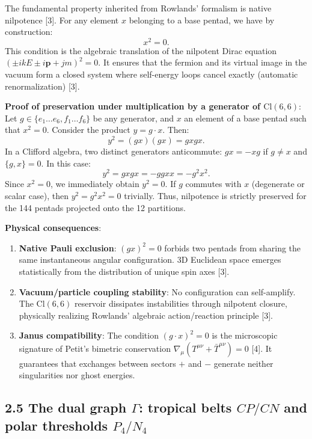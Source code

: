 \documentclass[11pt]{article}
\providecommand{\tightlist}{\setlength{\itemsep}{2pt}\setlength{\parskip}{6pt}}
\providecommand{\tightlist}{%
  \setlength{\itemsep}{2pt}\setlength{\parskip}{6pt}
}
\begin{document}
The fundamental property inherited from Rowlands' formalism is native
nilpotence {[}3{]}. For any element \(x\) belonging to a base pentad, we
have by construction: \[
x^2 = 0.
\] This condition is the algebraic translation of the nilpotent Dirac
equation \((\pm ikE \pm i\mathbf{p} + jm)^2 = 0\). It ensures that the
fermion and its virtual image in the vacuum form a closed system where
self-energy loops cancel exactly (automatic renormalization) {[}3{]}.

\textbf{Proof of preservation under multiplication by a generator of
\(\text{Cl}(6,6)\)}: Let \(g \in \{e_1\dots e_6, f_1\dots f_6\}\) be any
generator, and \(x\) an element of a base pentad such that \(x^2=0\).
Consider the product \(y = g \cdot x\). Then: \[
y^2 = (g x)(g x) = g x g x.
\] In a Clifford algebra, two distinct generators anticommute:
\(g x = -x g\) if \(g \neq x\) and \(\{g,x\}=0\). In this case: \[
y^2 = g x g x = -g g x x = -g^2 x^2.
\] Since \(x^2 = 0\), we immediately obtain \(y^2 = 0\). If \(g\)
commutes with \(x\) (degenerate or scalar case), then
\(y^2 = g^2 x^2 = 0\) trivially. Thus, nilpotence is strictly preserved
for the 144 pentads projected onto the 12 partitions.

\textbf{Physical consequences}:

\begin{enumerate}
\def\labelenumi{\arabic{enumi}.}
\tightlist
\item
  \textbf{Native Pauli exclusion}: \((g x)^2 = 0\) forbids two pentads
  from sharing the same instantaneous angular configuration. 3D
  Euclidean space emerges statistically from the distribution of unique
  spin axes {[}3{]}.
\item
  \textbf{Vacuum/particle coupling stability}: No configuration can
  self-amplify. The \(\text{Cl}(6,6)\) reservoir dissipates
  instabilities through nilpotent closure, physically realizing
  Rowlands' algebraic action/reaction principle {[}3{]}.
\item
  \textbf{Janus compatibility}: The condition \((g\cdot x)^2=0\) is the
  microscopic signature of Petit's bimetric conservation
  \(\nabla_\mu(T^{\mu\nu}+\bar{T}^{\mu\nu})=0\) {[}4{]}. It guarantees
  that exchanges between sectors \(+\) and \(-\) generate neither
  singularities nor ghost energies.
\end{enumerate}

\hypertarget{the-dual-graph-gamma-tropical-belts-cpcn-and-polar-thresholds-p_4n_4}{%
\subsection{\texorpdfstring{2.5 The dual graph \(\Gamma\): tropical
belts \(CP/CN\) and polar thresholds
\(P_4/N_4\)}{2.5 The dual graph \textbackslash Gamma: tropical belts CP/CN and polar thresholds P\_4/N\_4}}\label{the-dual-graph-gamma-tropical-belts-cpcn-and-polar-thresholds-p_4n_4}}
\end{document}
